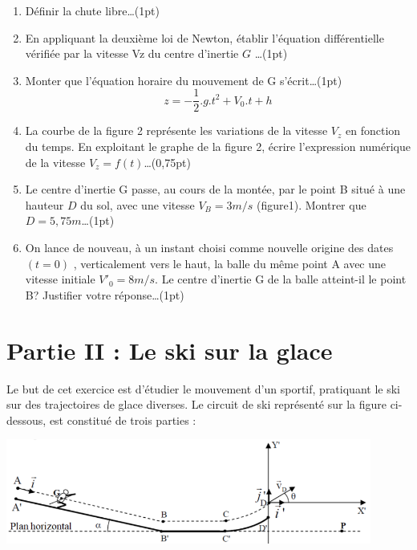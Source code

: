 \documentclass[12pt]{article}
\begin{document}
\begin{enumerate}
  \item Définir la chute libre\dots(1pt)

  \item En appliquant la deuxième loi de Newton, établir l’équation
    différentielle vérifiée par la vitesse Vz du centre d’inertie $G$ \dots(1pt)

  \item Monter que l’équation horaire du mouvement de G s’écrit\dots(1pt) $$z = -\frac{1}{2}.g.t^2 + V_0.t + h$$

  \item La courbe de la figure 2 représente les variations de
la vitesse $V_z$ en fonction du temps.
En exploitant le graphe de la figure 2, écrire
    l’expression numérique de la vitesse $V_z = f(t)$\dots(0,75pt)
  
  \item Le centre d’inertie G passe, au cours de la montée,
    par le point B situé à une hauteur $D$ du sol, avec une vitesse $V_B = 3m/s$ (figure1). Montrer que $D=5,75m$\dots(1pt)

\item On lance de nouveau, à un instant choisi comme
nouvelle origine des dates $(t=0)$ , verticalement vers le
haut, la balle du même point A avec une vitesse
initiale $V'_0 =8m/s$. Le centre d’inertie G de la balle
    atteint-il le point B? Justifier votre réponse\dots(1pt)

\end{enumerate}

\section*{Partie II : Le ski sur la glace}
Le but de cet exercice est d’étudier le mouvement d’un sportif, pratiquant le ski sur
des trajectoires de glace diverses.
Le circuit de ski représenté sur la figure ci-dessous, est constitué de trois parties :


\begin{center}
  \includegraphics[width=0.9\textwidth]{./img/mvt_plan.png}
\end{center}
\end{document}
